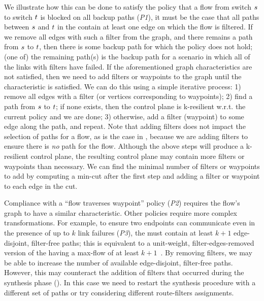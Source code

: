 We illustrate how this can be done
to satisfy the policy that a flow from switch $s$ to
switch $t$ is blocked on all backup paths ({\em P1}), it must be the
case that all paths between $s$ and $t$ in the \ARC contain
at least one edge on which the flow is filtered. If we remove all edges with
such a filter from the graph, and there remains a path from $s$ to
$t$, then there is some backup path for which the policy does not
hold; (one of) the remaining path(s) is the backup path for a scenario in
which all of the links with filters have failed. 
If the aforementioned graph characteristics are not satisfied, then we need to
add filters or waypoints to the graph until the characteristic is satisfied.
We can do this using a simple iterative process: 
1) remove all edges with a filter (or vertices corresponding to waypoints);
2) find a path from $s$ to $t$; if none exists,
    then the control plane is k-resilient w.r.t. the current policy and we are done;
 3) otherwise, add a filter (waypoint) to some edge along the path, and repeat.
Note that adding filters does not impact the selection of paths for a flow, as
is the case in , because we are adding filters to
ensure there is {\em no} path for the flow.
Although the above steps will produce a k-resilient control plane, the
resulting control plane may contain more filters or waypoints than necessary.
We can find the minimal number of filters or waypoints to add by computing a
min-cut after the first step and adding a filter or waypoint to each edge in the cut. 

Compliance with a ``flow
traverses waypoint'' policy ({\em P2}) requires the flow's graph to have a
similar characteristic.
Other policies require more complex transformations. For example, to ensure
two endpoints can communicate even in the presence of up to $k$ link failures
({\em P3}), the \ARC must contain at least $k+1$
edge-disjoint, filter-free paths; this is equivalent to a unit-weight,
filter-edges-removed version of the \ARC having a max-flow of at least
$k+1$~\cite{arc}. By removing filters, we may be able to increase the number
of available edge-disjoint, filter-free paths. However, this may counteract
the addition of filters that occurred during the \ARC synthesis phase
(). In this case we need to restart the synthesis procedure
with a different set of paths or try considering different route-filters assignments.
